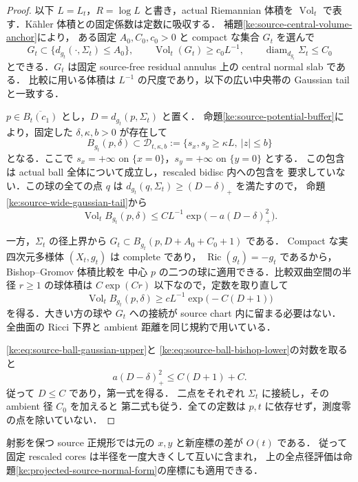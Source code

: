 \begin{proof}
以下 $L=L_t$，$R=\log L$ と書き，actual Riemannian 体積を $\operatorname{Vol}_t$
で表す．K\"ahler 体積との固定係数は定数に吸収する．
補題\ref{ke:source-central-volume-anchor}により，
ある固定 $A_0,C_0,c_0>0$ と compact な集合 $G_t$ を選んで
\[
 G_t\subset\{d_{g_t}(\cdot,\Sigma_t)\le A_0\},\qquad
 \operatorname{Vol}_t(G_t)\ge c_0L^{-1},\qquad
 \operatorname{diam}_{d_{g_t}}\Sigma_t\le C_0
\]
とできる．$G_t$ は固定 source-free residual annulus 上の central normal slab である．
比較に用いる体積は $L^{-1}$ の尺度であり，以下の広い中央帯の Gaussian tail と一致する．

$p\in\overline{B_t(c_1)}$ とし，$D=d_{g_t}(p,\Sigma_t)$ と置く．
命題\ref{ke:source-potential-buffer}により，固定した $\delta,\kappa,b>0$ が存在して
\[
 B_{g_t}(p,\delta)\subset
 \mathcal D_{t,\kappa,b}
 :=\{s_x,s_y\ge\kappa L,\ |z|\le b\}
\]
となる．ここで $s_x=+\infty$ on $\{x=0\}$，$s_y=+\infty$ on $\{y=0\}$ とする．
この包含は actual ball 全体について成立し，rescaled bidisc 内への包含を
要求していない．この球の全ての点 $q$ は
$d_{g_t}(q,\Sigma_t)\ge(D-\delta)_+$ を満たすので，
命題\ref{ke:source-wide-gaussian-tail}から
\begin{equation}\label{ke:eq:source-ball-gaussian-upper}
 \operatorname{Vol}_t B_{g_t}(p,\delta)
 \le C L^{-1}\exp\bigl(-a(D-\delta)_+^2\bigr).
\end{equation}

一方，$\Sigma_t$ の径上界から
$G_t\subset B_{g_t}(p,D+A_0+C_0+1)$ である．
Compact な実四次元多様体 $(X_t,g_t)$ は complete であり，
$\operatorname{Ric}(g_t)=-g_t$ であるから，Bishop--Gromov 体積比較を
中心 $p$ の二つの球に適用できる．比較双曲空間の半径 $r\ge1$ の球体積は
$C\exp(Cr)$ 以下なので，定数を取り直して
\begin{equation}\label{ke:eq:source-ball-bishop-lower}
 \operatorname{Vol}_t B_{g_t}(p,\delta)
 \ge c L^{-1}\exp\bigl(-C(D+1)\bigr)
\end{equation}
を得る．大きい方の球や $G_t$ への接続が source chart 内に留まる必要はない．
全曲面の Ricci 下界と ambient 距離を同じ規約で用いている．

\eqref{ke:eq:source-ball-gaussian-upper}と
\eqref{ke:eq:source-ball-bishop-lower}の対数を取ると
\[
 a(D-\delta)_+^2\le C(D+1)+C.
\]
従って $D\le C$ であり，第一式を得る．
二点をそれぞれ $\Sigma_t$ に接続し，その ambient 径 $C_0$ を加えると
第二式も従う．全ての定数は $p,t$ に依存せず，測度零の点を除いていない．
\end{proof}

射影を保つ source 正規形では元の $x,y$ と新座標の差が $O(t)$ である．
従って固定 rescaled cores は半径を一度大きくして互いに含まれ，
上の全点径評価は命題\ref{ke:projected-source-normal-form}の座標にも適用できる．

